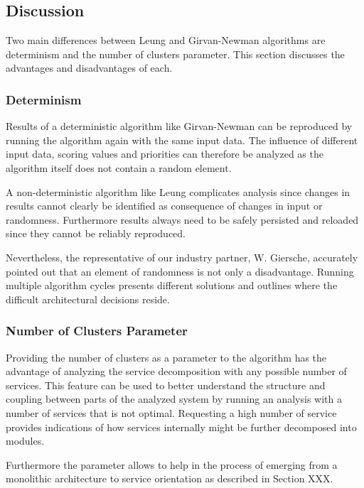 \subsection{Discussion}
\label{subsec:algoDiscussion}

Two main differences between Leung and Girvan-Newman algorithms are determinism and the number of clusters parameter. This section discusses the advantages and disadvantages of each.

\subsubsection{Determinism}

Results of a deterministic algorithm like Girvan-Newman can be reproduced by running the algorithm again with the same input data. The influence of different input data, scoring values and priorities can therefore be analyzed as the algorithm itself does not contain a random element.

A non-deterministic algorithm like Leung complicates analysis since changes in results cannot clearly be identified as consequence of changes in input or randomness. Furthermore results always need to be safely persisted and reloaded since they cannot be reliably reproduced. 

Nevertheless, the representative of our industry partner, W. Giersche, accurately pointed out that an element of randomness is not only a disadvantage. Running multiple algorithm cycles presents different solutions and outlines where the difficult architectural decisions reside.

\subsubsection{Number of Clusters Parameter}

Providing the number of clusters as a parameter to the algorithm has the advantage of analyzing the service decomposition with any possible number of services. This feature can be used to better understand the structure and coupling between parts of the analyzed system by running an analysis with a number of services that is not optimal. Requesting a high number of service provides indications of how services internally might be further decomposed into modules. 

Furthermore the parameter allows to help in the process of emerging from a monolithic architecture to service orientation as described in Section XXX.

